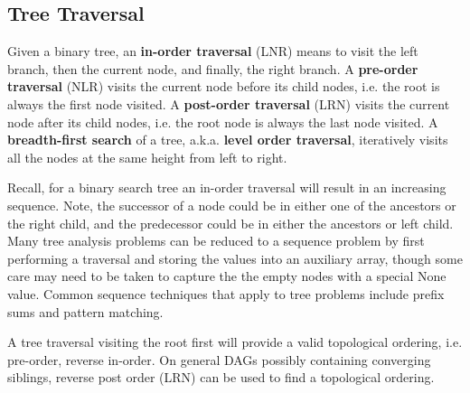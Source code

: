 \documentclass{article}
\begin{document}
    
    \subsection{Tree Traversal}
    Given a binary tree, an \textbf{in-order traversal} (LNR) means to visit the left branch, then the current node, and finally, the right branch. A \textbf{pre-order traversal} (NLR) visits the current node before its child nodes, i.e. the root is always the first node visited. A \textbf{post-order traversal} (LRN) visits the current node after its child nodes, i.e. the root node is always the last node visited. A \textbf{breadth-first search} of a tree, a.k.a. \textbf{level order traversal}, iteratively visits all the nodes at the same height from left to right.
    
    Recall, for a binary search tree an in-order traversal will result in an increasing sequence. Note, the successor of a node could be in either one of the ancestors or the right child, and the predecessor could be in either the ancestors or left child. Many tree analysis problems can be reduced to a sequence problem by first performing a traversal and storing the values into an auxiliary array, though some care may need to be taken to capture the the empty nodes with a special None value. Common sequence techniques that apply to tree problems include prefix sums and pattern matching.

    A tree traversal visiting the root first will provide a valid topological ordering, i.e. pre-order, reverse in-order. On general DAGs possibly containing converging siblings, reverse post order (LRN) can be used to find a topological ordering.
\end{document}
